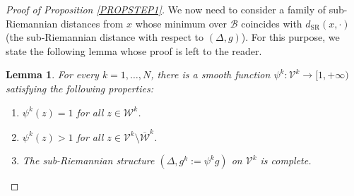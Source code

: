 \documentclass[JEP,XML,SOM,Unicode,NoFloatCountersInSection,published]{cedram}
\newenvironment{enumeratei}
{\bgroup\def\theenumi{\roman{enumi}}\def\theenumii{\arabic{enumii}}\begin{enumerate}}
{\end{enumerate}\egroup}
\newcommand{\SR}{{\scriptscriptstyle\mathrm{SR}}}
\newtheorem{lemma}[theorem]{Lemma}
\theoremstyle{definition}
\begin{document}
\begin{proof}[Proof of Proposition \ref{PROPSTEP1}]
We now need to consider a family of sub-Riemannian distances from $x$ whose minimum over $\mathcal{B}$ coincides with $d_{\SR}(x,\cdot)$ (the sub-Riemannian distance with respect to $(\Delta,g)$). For this purpose, we state the following lemma whose proof is left to the reader.

\begin{lemma}\label{STEP1_LEM3}
For every $k=1, \ldots,N$, there is a smooth function $\psi^k : \mathcal{V}^k \to [1,+\infty)$ satisfying the following properties:
\begin{enumeratei}
\item\label{STEP1_LEM3i}
$\psi^k(z)=1$ for all $z\in \mathcal{W}^k$.
\item\label{STEP1_LEM3ii}
$\psi^k(z)>1$ for all $z\in \mathcal{V}^k \setminus \overline{\mathcal{W}}^k$.
\item\label{STEP1_LEM3iii}
The sub-Riemannian structure $(\Delta,g^k:=\psi^k g)$ on $\mathcal{V}^k$ is complete.
\end{enumeratei}
\end{lemma}


\end{proof}
\end{document}
